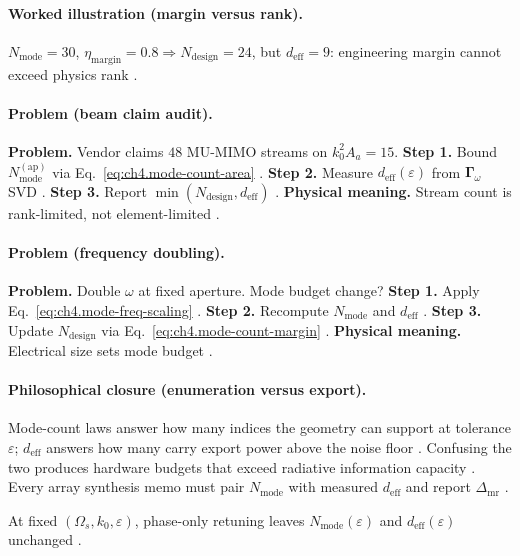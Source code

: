 \paragraph{Worked illustration (margin versus rank).}
\(N_{\mathrm{mode}}=30\), \(\eta_{\mathrm{margin}}=0.8\Rightarrow N_{\mathrm{design}}=24\), but \(d_{\mathrm{eff}}=9\): engineering margin
cannot exceed physics rank \cite{harrington2001,stratton1941}.

\paragraph{Problem (beam claim audit).}
\textbf{Problem.} Vendor claims \(48\) MU-MIMO streams on \(k_{0}^{2}A_{a}=15\).
\textbf{Step 1.} Bound \(N_{\mathrm{mode}}^{\mathrm{(ap)}}\) via Eq.~\eqref{eq:ch4.mode-count-area} \cite{jackson1999,hansen1988}.
\textbf{Step 2.} Measure \(d_{\mathrm{eff}}(\varepsilon)\) from \(\boldsymbol{\Gamma}_\omega\) SVD \cite{harrington2001,devaney2004}.
\textbf{Step 3.} Report \(\min(N_{\mathrm{design}},d_{\mathrm{eff}})\) \cite{stratton1941}.
\textbf{Physical meaning.} Stream count is rank-limited, not element-limited \cite{collin2001}.

\paragraph{Problem (frequency doubling).}
\textbf{Problem.} Double \(\omega\) at fixed aperture. Mode budget change?
\textbf{Step 1.} Apply Eq.~\eqref{eq:ch4.mode-freq-scaling} \cite{jackson1999,hansen1988}.
\textbf{Step 2.} Recompute \(N_{\mathrm{mode}}\) and \(d_{\mathrm{eff}}\) \cite{harrington2001}.
\textbf{Step 3.} Update \(N_{\mathrm{design}}\) via Eq.~\eqref{eq:ch4.mode-count-margin} \cite{devaney2004}.
\textbf{Physical meaning.} Electrical size sets mode budget \cite{stratton1941}.

\paragraph{Philosophical closure (enumeration versus export).}
Mode-count laws answer how many indices the geometry can support at tolerance \(\varepsilon\); \(d_{\mathrm{eff}}\) answers how many carry
export power above the noise floor \cite{hansen1988,stratton1941,harrington2001}. Confusing the two produces hardware budgets that exceed
radiative information capacity \cite{devaney2004,collin2001}. Every array synthesis memo must pair \(N_{\mathrm{mode}}\) with measured
\(d_{\mathrm{eff}}\) and report \(\Delta_{\mathrm{mr}}\) \cite{harrington2001}.

\begin{corollary}
\label{cor:ch4.phase-no-mode-gain}
At fixed \((\Omega_{s},k_{0},\varepsilon)\), phase-only retuning leaves \(N_{\mathrm{mode}}(\varepsilon)\) and \(d_{\mathrm{eff}}(\varepsilon)\) unchanged
\cite{devaney2004,harrington2001,stratton1941,hansen1988}.
\end{corollary}
